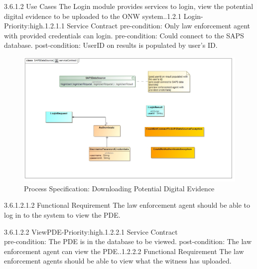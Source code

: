 \documentclass[a4paper,12pt]{article}
\begin{document}
3.6.1.2 Use Cases\newline
The Login module provides services to login, view the potential digital evidence to be uploaded to the ONW system..1.2.1 Login-Priority:high.1.2.1.1 Service Contract\newline
	pre-condition: Only law enforcement agent with provided credentials can login.\newline
	pre-condition: Could connect to the SAPS database.\newline
	post-condition: UserID on results is populated by user's ID.\newline
		\begin{figure}[H]
\includegraphics[width=\textwidth]{images/SAPSserviceContract.jpg}
\caption{Process Specification: Downloading Potential Digital Evidence \label{overflow}}
\end{figure}
	3.6.1.2.1.2 Functional Requirement\newline
	The law enforcement agent should be able to log in to the system to view the PDE.\newline
	
3.6.1.2.2 ViewPDE-Priority:high.1.2.2.1 Service Contract\newline\\
	pre-condition: The PDE is in the database to be viewed.\newline
	post-condition: The law enforcement agent can view the PDE..1.2.2.2 Functional Requirement\newline
	The law enforcement agents should be able to view what the witness has uploaded.\newline
	
\end{document}
